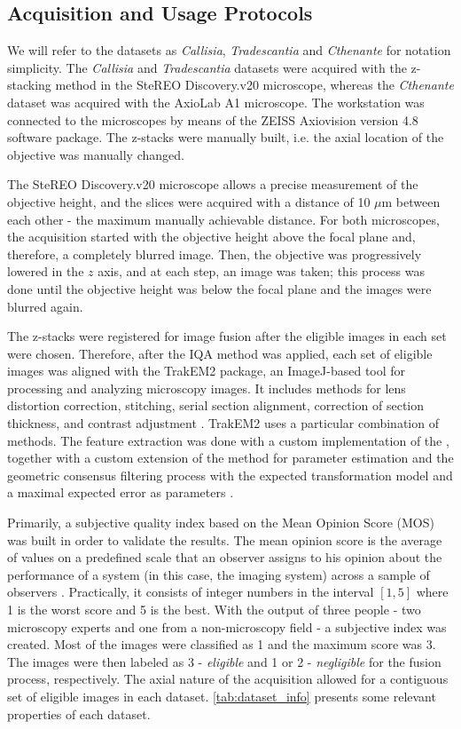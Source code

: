 \subsection{Acquisition and Usage Protocols}

We will refer to the datasets as \textit{Callisia}, \textit{Tradescantia} and \textit{Cthenante} for notation simplicity. The \textit{Callisia} and \textit{Tradescantia} datasets were acquired with the z-stacking method in the SteREO Discovery.v20 microscope, whereas the \textit{Cthenante} dataset was acquired with the AxioLab A1 microscope. The workstation was connected to the microscopes by means of the ZEISS Axiovision version 4.8 software package. The z-stacks were manually built, i.e. the axial location of the objective was manually changed.

The SteREO Discovery.v20 microscope allows a precise measurement of the objective height, and the slices were acquired with a distance of 10 $\mu$m between each other - the maximum manually achievable distance. For both microscopes, the acquisition started with the objective height above the focal plane and, therefore, a completely blurred image. Then, the objective was progressively lowered in the $z$ axis, and at each step, an image was taken; this process was done until the objective height was below the focal plane and the images were blurred again.

The z-stacks were registered for image fusion after the eligible images in each set were chosen. Therefore, after the IQA method was applied, each set of eligible images was aligned with the TrakEM2 package, an ImageJ-based tool for processing and analyzing microscopy images. It includes methods for lens distortion correction, stitching, serial section alignment, correction of section thickness, and contrast adjustment \cite{saalfeld2019computational}. TrakEM2 uses  a particular combination of methods. The feature extraction was done with a custom implementation of the , together with a custom extension of the  method for parameter estimation and the geometric consensus filtering process with the expected transformation model and a maximal expected error as parameters \cite{saalfeld2019computational}. 

Primarily, a subjective quality index based on the Mean Opinion Score (MOS) was built in order to validate the results. The mean opinion score is the average of values on a predefined scale that an observer assigns to his opinion about the performance of a system (in this case, the imaging system) across a sample of observers \cite{liu2019comprehensive}. Practically, it consists of integer numbers in the interval $[1,5]$ where 1 is the worst score and 5 is the best. With the output of three people - two microscopy experts and one from a non-microscopy field - a subjective index was created. Most of the images were classified as 1 and the maximum score was 3. The images were then labeled as 3 - \emph{eligible} and 1 or 2 - \emph{negligible} for the fusion process, respectively. The axial nature of the acquisition allowed for a contiguous set of eligible images in each dataset. \autoref{tab:dataset_info} presents some relevant properties of each dataset.

